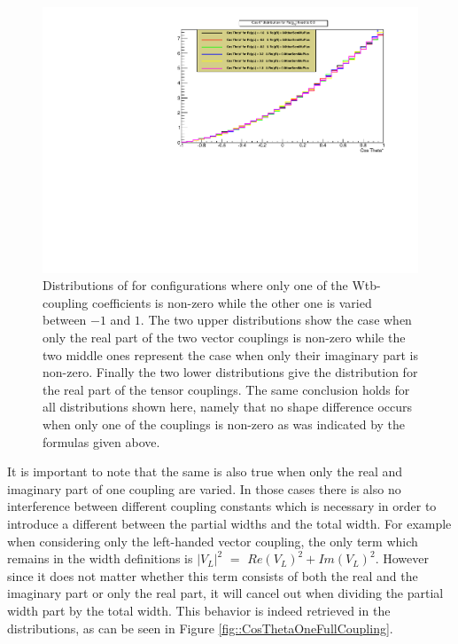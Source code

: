 \begin{figure}[h!]
 \includegraphics[width = 0.45 \textwidth]{Afbeeldingen/Chapter_LinkWithTopWidth/CosThetaResults/RgRvsRgL/RgLRgR_CosTheta_RgRFixedTo00.pdf}    %
 \caption{Distributions of \csTh for configurations where only one of the Wtb-coupling coefficients is non-zero while the other one is varied between $-1$ and $1$. The two upper distributions show the case when only the real part of the two vector couplings is non-zero while the two middle ones represent the case when only their imaginary part is non-zero. Finally the two lower distributions give the \csTh distribution for the real part of the tensor couplings. The same conclusion holds for all distributions shown here, namely that no shape difference occurs when only one of the couplings is non-zero as was indicated by the formulas given above.}
 \label{fig::CosThetaOneCoupling}
\end{figure}

It is important to note that the same is also true when only the real and imaginary part of one coupling are varied. In those cases there is also no interference between different coupling constants which is necessary in order to introduce a different between the partial widths and the total width. For example when considering only the left-handed vector coupling, the only term which remains in the width definitions is $\vert V_{L} \vert^{2}$ $=$ $Re(V_{L})^{2} + Im(V_{L})^{2}$. However since it does not matter whether this term consists of both the real and the imaginary part or only the real part, it will cancel out when dividing the partial width part by the total width. This behavior is indeed retrieved in the \csTh distributions, as can be seen in Figure \ref{fig::CosThetaOneFullCoupling}.\\

